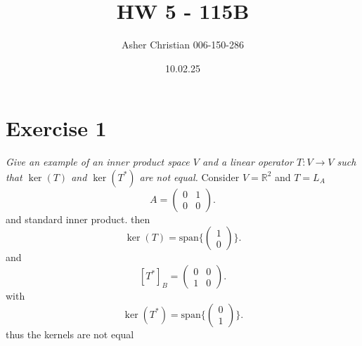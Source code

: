 \documentclass{article}
\title{HW 5 - 115B}
\author{Asher Christian 006-150-286}
\date{ 10.02.25}
\begin{document}
    \maketitle
    \section{Exercise 1}
    \emph{
        Give an example of an inner product space $V$ and a linear operator $T: V \rightarrow V$ such
        that $\ker(T)$ and $\ker(T^{*})$ are not equal.
    }
    Consider $V = \mathbb{R}^{2}$ and $T = L_A$
    \[
        A =  \begin{pmatrix} 0 & 1 \\ 0 & 0 \end{pmatrix} 
    .\] 
    and standard inner product.
    then
    \[
        \ker(T) = \text{span}\{ \begin{pmatrix} 1 \\ 0 \end{pmatrix} \}
    .\] 
    and
    \[
        [T^{*}]_B = \begin{pmatrix} 0 & 0 \\ 1 & 0 \end{pmatrix} 
    .\] 
    with
    \[
        \ker(T^{*})  = \text{span}\{\begin{pmatrix} 0 \\ 1 \end{pmatrix} \}
    .\] 
    thus the kernels are not equal
\end{document}
